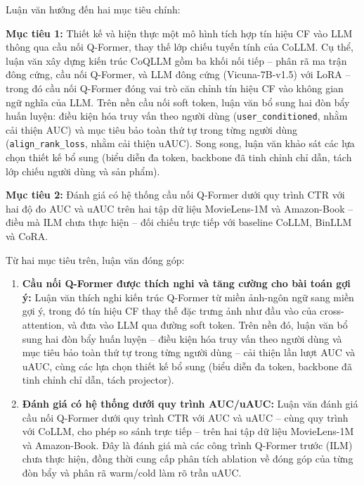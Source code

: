 Luận văn hướng đến hai mục tiêu chính:

\textbf{Mục tiêu 1:} Thiết kế và hiện thực một mô hình tích hợp tín hiệu CF vào LLM
thông qua cầu nối Q-Former, thay thế lớp chiếu tuyến tính của CoLLM. Cụ thể, luận văn
xây dựng kiến trúc CoQLLM gồm ba khối nối tiếp -- phân rã ma trận đông cứng, cầu nối
Q-Former, và LLM đông cứng (Vicuna-7B-v1.5) với LoRA -- trong đó cầu nối Q-Former đóng vai
trò căn chỉnh tín hiệu CF vào không gian ngữ nghĩa của LLM. Trên nền cầu nối soft token,
luận văn bổ sung hai đòn bẩy huấn luyện: điều kiện hóa truy vấn theo người dùng
(\texttt{user\_conditioned}, nhằm cải thiện AUC) và mục tiêu bảo toàn thứ tự
trong từng người dùng (\texttt{align\_rank\_loss}, nhằm cải thiện uAUC). Song song, luận văn khảo
sát các lựa chọn thiết kế bổ sung (biểu diễn đa token, backbone đã tinh chỉnh chỉ dẫn, tách
lớp chiếu người dùng và sản phẩm).

\textbf{Mục tiêu 2:} Đánh giá có hệ thống cầu nối Q-Former dưới quy trình CTR với hai
độ đo AUC và uAUC trên hai tập dữ liệu MovieLens-1M và Amazon-Book -- điều mà ILM chưa thực
hiện -- đối chiếu trực tiếp với baseline CoLLM, BinLLM và CoRA.

Từ hai mục tiêu trên, luận văn đóng góp:

\begin{enumerate}
    \item \textbf{Cầu nối Q-Former được thích nghi và tăng cường cho bài toán gợi ý:}
    Luận văn thích nghi kiến trúc Q-Former từ miền ảnh-ngôn ngữ sang miền gợi ý,
    trong đó tín hiệu CF thay thế đặc trưng ảnh như đầu vào của cross-attention, và đưa
    vào LLM qua đường soft token. Trên nền đó, luận văn bổ sung hai đòn bẩy huấn luyện --
    điều kiện hóa truy vấn theo người dùng và mục tiêu bảo toàn thứ tự trong từng người dùng --
    cải thiện lần lượt AUC và uAUC, cùng các lựa chọn thiết kế bổ sung (biểu diễn đa token,
    backbone đã tinh chỉnh chỉ dẫn, tách projector).

    \item \textbf{Đánh giá có hệ thống dưới quy trình AUC/uAUC:} Luận văn đánh giá
    cầu nối Q-Former dưới quy trình CTR với AUC và uAUC -- cùng quy trình với CoLLM,
    cho phép so sánh trực tiếp -- trên hai tập dữ liệu MovieLens-1M và Amazon-Book. Đây là
    đánh giá mà các công trình Q-Former trước (ILM) chưa thực hiện, đồng thời cung cấp phân
    tích ablation về đóng góp của từng đòn bẩy và phân rã warm/cold làm rõ trần uAUC.
\end{enumerate}

